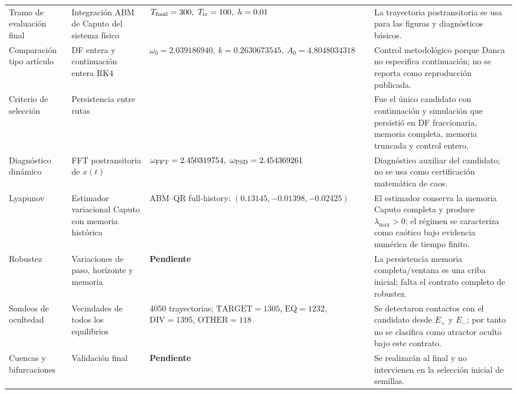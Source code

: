 \documentclass[journal]{IEEEtran}
\begin{document}
\begin{table}[htbp]
\begin{adjustbox}{max width=\textwidth}
\begin{tabular}{@{}L{2.7cm}L{3.4cm}L{4.4cm}L{5.8cm}@{}}
Tramo de evaluación final &
Integración ABM de Caputo del sistema físico &
\(T_{\rm final}=300,\ T_{\rm tr}=100,\ h=0.01\) &
La trayectoria postransitoria se usa para las figuras y diagnósticos básicos. \\

Comparación tipo artículo &
DF entera y continuación entera RK4 &
\(\omega_0=2.039186940,\ k=0.2630673545,\ A_0=4.8048034318\) &
Control metodológico porque Danca no especifica continuación; no se reporta como reproducción publicada. \\

Criterio de selección &
Persistencia entre rutas &
 &
Fue el único candidato con continuación y simulación  que persistió en DF fraccionaria, memoria completa, memoria truncada y control entero. \\

Diagnóstico dinámico &
FFT postransitoria de \(x(t)\) &
\(\omega_{\rm FFT}=2.450319754,\ \omega_{\rm PSD}=2.454369261\) &
Diagnóstico auxiliar del candidato; no se usa como certificación matemática de caos. \\

Lyapunov &
Estimador variacional Caputo con memoria histórica &
ABM--QR full-history: \((0.13145,-0.01398,-0.02425)\) &
El estimador conserva la memoria Caputo completa y produce \(\lambda_{\max}>0\); el régimen se caracteriza como caótico bajo evidencia numérica de tiempo finito. \\

Robustez &
Variaciones de paso, horizonte y memoria &
\textbf{Pendiente} &
La persistencia memoria completa/ventana es una criba inicial; falta el contrato completo de robustez. \\

Sondeos de ocultedad &
Vecindades de todos los equilibrios &
4050 trayectorias; \(\mathrm{TARGET}=1305\), \(\mathrm{EQ}=1232\), \(\mathrm{DIV}=1395\), \(\mathrm{OTHER}=118\) &
Se detectaron contactos con el candidato desde \(E_+\) y \(E_-\); por tanto no se clasifica como atractor oculto bajo este contrato. \\

Cuencas y bifurcaciones &
Validación final &
\textbf{Pendiente} &
Se realizarán al final y no intervienen en la selección inicial de semillas. \\

\bottomrule
\end{tabular}
\end{adjustbox}
\end{table}
\end{document}
